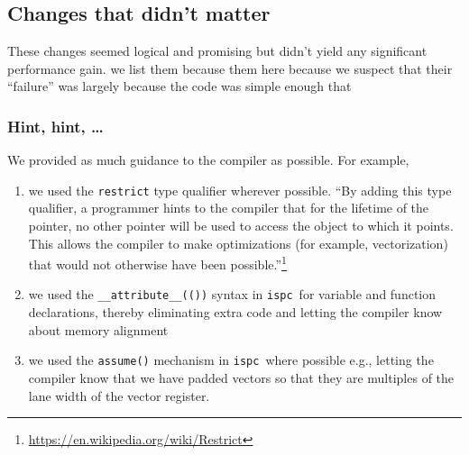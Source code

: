\documentclass[letterpaper,12pt]{article}
\newcommand{\ISPC}{{\tt ispc}}
\newcommand{\be}{\begin{enumerate}}
\newcommand{\ee}{\end{enumerate}}
\begin{document}
\subsection{Changes that didn't matter}

These changes seemed logical and promising but didn't yield any 
significant performance gain. 
we list them because them here because we suspect that
their ``failure'' was largely because the code was simple enough that 




\subsubsection{Hint, hint, \ldots}

We provided as much guidance to the compiler as possible. For example,
\be
\item we used the {\tt restrict} type qualifier wherever possible. ``By adding
  this type qualifier, a programmer hints to the compiler that for the lifetime
  of the pointer, no other pointer will be used to access the object to which it
  points. This allows the compiler to make optimizations (for example,
  vectorization) that would not otherwise have been
  possible.''\footnote{\url{https://en.wikipedia.org/wiki/Restrict}}
\item we used the \verb+__attribute__(())+ syntax in \ISPC\ for variable and function
  declarations, thereby eliminating extra code and letting the compiler know
  about memory alignment
\item we used the {\tt assume()} mechanism in \ISPC\ where possible e.g., letting the
  compiler know that we have padded vectors so that they are multiples of 
  the
  lane width of the vector register.
  \ee
\end{document}
